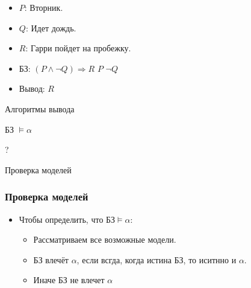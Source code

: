 \begin{frame}
	\Large
	\begin{itemize}[label={}]
		\item $P$: Вторник.
		\item $Q$: Идет дождь.
		\item $R$: Гарри пойдет на пробежку.

			\;\pause
		
		\item БЗ: \pause $(P∧¬Q)\Rightarrow R$ \;\;\; \pause $P$ \;\;\;\pause $¬Q$

			\;\pause

		\item Вывод: \pause $R$
	\end{itemize}
\end{frame}

\begin{frame}
	\Huge
	\begin{center}
	Алгоритмы вывода
	\end{center}
\end{frame}

\begin{frame}
	\Huge
	\begin{center}
		БЗ $\models \alpha$

		?
	\end{center}
\end{frame}

\begin{frame}
	\Huge
	\begin{center}
		Проверка моделей
	\end{center}
\end{frame}

\begin{frame}
	\frametitle{Проверка моделей}
	\begin{itemize}
		\item Чтобы определить, что БЗ$\models \alpha$:
			\pause
			\begin{itemize}[label=\textbullet]
				\item Рассматриваем все возможные
					модели.\pause
				\item БЗ влечёт $\alpha$, если
					всгда, когда истина БЗ, 
					то иситнно и $\alpha$.\pause
				\item Иначе БЗ не влечет $\alpha$
			\end{itemize}
	\end{itemize}
\end{frame}

